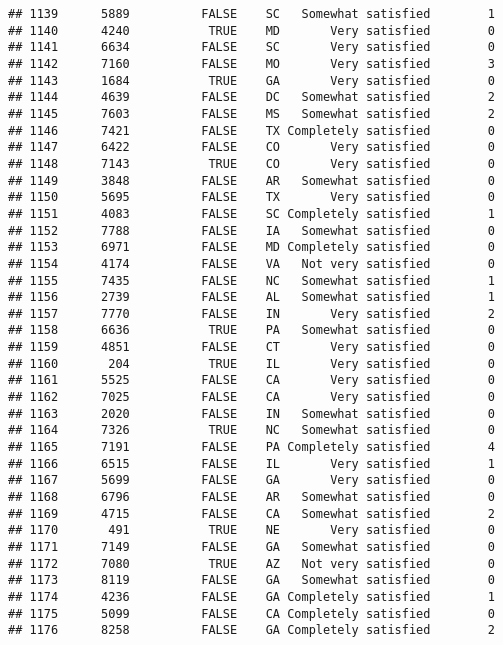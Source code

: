 \documentclass[]{book}
\theoremstyle{definition}
\theoremstyle{definition}
\theoremstyle{remark}
\begin{document}
\begin{verbatim}
## 1139      5889          FALSE    SC   Somewhat satisfied        1
## 1140      4240           TRUE    MD       Very satisfied        0
## 1141      6634          FALSE    SC       Very satisfied        0
## 1142      7160          FALSE    MO       Very satisfied        3
## 1143      1684           TRUE    GA       Very satisfied        0
## 1144      4639          FALSE    DC   Somewhat satisfied        2
## 1145      7603          FALSE    MS   Somewhat satisfied        2
## 1146      7421          FALSE    TX Completely satisfied        0
## 1147      6422          FALSE    CO       Very satisfied        0
## 1148      7143           TRUE    CO       Very satisfied        0
## 1149      3848          FALSE    AR   Somewhat satisfied        0
## 1150      5695          FALSE    TX       Very satisfied        0
## 1151      4083          FALSE    SC Completely satisfied        1
## 1152      7788          FALSE    IA   Somewhat satisfied        0
## 1153      6971          FALSE    MD Completely satisfied        0
## 1154      4174          FALSE    VA   Not very satisfied        0
## 1155      7435          FALSE    NC   Somewhat satisfied        1
## 1156      2739          FALSE    AL   Somewhat satisfied        1
## 1157      7770          FALSE    IN       Very satisfied        2
## 1158      6636           TRUE    PA   Somewhat satisfied        0
## 1159      4851          FALSE    CT       Very satisfied        0
## 1160       204           TRUE    IL       Very satisfied        0
## 1161      5525          FALSE    CA       Very satisfied        0
## 1162      7025          FALSE    CA       Very satisfied        0
## 1163      2020          FALSE    IN   Somewhat satisfied        0
## 1164      7326           TRUE    NC   Somewhat satisfied        0
## 1165      7191          FALSE    PA Completely satisfied        4
## 1166      6515          FALSE    IL       Very satisfied        1
## 1167      5699          FALSE    GA       Very satisfied        0
## 1168      6796          FALSE    AR   Somewhat satisfied        0
## 1169      4715          FALSE    CA   Somewhat satisfied        2
## 1170       491           TRUE    NE       Very satisfied        0
## 1171      7149          FALSE    GA   Somewhat satisfied        0
## 1172      7080           TRUE    AZ   Not very satisfied        0
## 1173      8119          FALSE    GA   Somewhat satisfied        0
## 1174      4236          FALSE    GA Completely satisfied        1
## 1175      5099          FALSE    CA Completely satisfied        0
## 1176      8258          FALSE    GA Completely satisfied        2

\end{verbatim}
\end{document}
